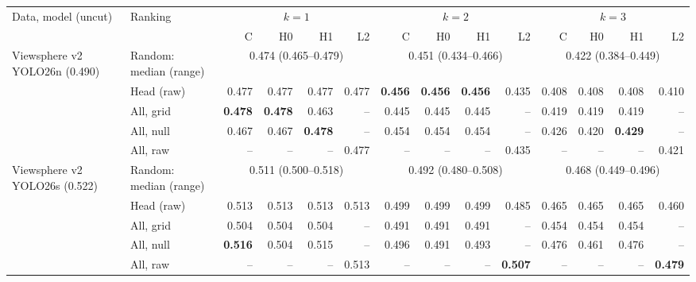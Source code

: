 \begin{tabular}{llrrrrrrrrrrrr}
\toprule
Data, model (uncut) & Ranking & \multicolumn{4}{c}{$k=1$} & \multicolumn{4}{c}{$k=2$} & \multicolumn{4}{c}{$k=3$} \\
\cmidrule(lr){3-6}\cmidrule(lr){7-10}\cmidrule(lr){11-14}
 & & C & H0 & H1 & L2 & C & H0 & H1 & L2 & C & H0 & H1 & L2 \\
\midrule
Viewsphere v2 YOLO26n (0.490) & Random: median (range) & \multicolumn{4}{c}{0.474 (0.465--0.479)} & \multicolumn{4}{c}{0.451 (0.434--0.466)} & \multicolumn{4}{c}{0.422 (0.384--0.449)} \\
 & Head (raw) & 0.477 & 0.477 & 0.477 & 0.477 & \textbf{0.456} & \textbf{0.456} & \textbf{0.456} & 0.435 & 0.408 & 0.408 & 0.408 & 0.410 \\
 & All, grid & \textbf{0.478} & \textbf{0.478} & 0.463 & -- & 0.445 & 0.445 & 0.445 & -- & 0.419 & 0.419 & 0.419 & -- \\
 & All, null & 0.467 & 0.467 & \textbf{0.478} & -- & 0.454 & 0.454 & 0.454 & -- & 0.426 & 0.420 & \textbf{0.429} & -- \\
 & All, raw & -- & -- & -- & 0.477 & -- & -- & -- & 0.435 & -- & -- & -- & 0.421 \\
\midrule
Viewsphere v2 YOLO26s (0.522) & Random: median (range) & \multicolumn{4}{c}{0.511 (0.500--0.518)} & \multicolumn{4}{c}{0.492 (0.480--0.508)} & \multicolumn{4}{c}{0.468 (0.449--0.496)} \\
 & Head (raw) & 0.513 & 0.513 & 0.513 & 0.513 & 0.499 & 0.499 & 0.499 & 0.485 & 0.465 & 0.465 & 0.465 & 0.460 \\
 & All, grid & 0.504 & 0.504 & 0.504 & -- & 0.491 & 0.491 & 0.491 & -- & 0.454 & 0.454 & 0.454 & -- \\
 & All, null & \textbf{0.516} & 0.504 & 0.515 & -- & 0.496 & 0.491 & 0.493 & -- & 0.476 & 0.461 & 0.476 & -- \\
 & All, raw & -- & -- & -- & 0.513 & -- & -- & -- & \textbf{0.507} & -- & -- & -- & \textbf{0.479} \\
\bottomrule
\end{tabular}
